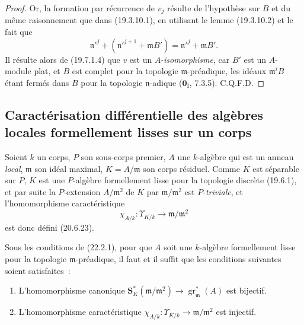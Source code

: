 \begin{proof}

Or, la formation par récurrence de $v_j$ résulte de l'hypothèse sur $B$ et
du même raisonnement que dans (19.3.10.1), en utilisant le lemme
(19.3.10.2) et le fait que
\[
  \mathfrak n'^j+(\mathfrak n'^{j+1}+\mathfrak mB')
  =\mathfrak n'^j+\mathfrak mB'.
\]
Il résulte alors de (19.7.1.4) que $v$ est un $A$-\emph{isomorphisme}, car
$B'$ est un $A$-module plat, et $B$ est complet pour la topologie
$\mathfrak m$-préadique, les idéaux $\mathfrak m^iB$ étant fermés dans $B$
pour la topologie $\mathfrak n$-adique ($\mathbf 0_{\mathrm I}$, 7.3.5).
C.Q.F.D.
\end{proof}

\subsection{Caractérisation différentielle des algèbres locales formellement
lisses sur un corps}
\label{subsection:0.22.2-fr}

\begin{env}[22.2.1]
\label{0.22.2.1-fr}
Soient $k$ un corps, $P$ son sous-corps premier, $A$ une $k$-algèbre qui est
un anneau \emph{local}, $\mathfrak m$ son idéal maximal, $K=A/\mathfrak m$
son corps résiduel. Comme $K$ est séparable sur $P$, $K$ est une
$P$-algèbre formellement lisse pour la topologie discrète (19.6.1), et par
suite la $P$-extension $A/\mathfrak m^2$ de $K$ par
$\mathfrak m/\mathfrak m^2$ est $P$-\emph{triviale}, et l'homomorphisme
caractéristique
\begin{equation}
\tag{22.2.1.1}
\label{0.22.2.1.1-fr}
  \chi_{A/k}:\Upsilon_{K/k}\longrightarrow\mathfrak m/\mathfrak m^2
\end{equation}
est donc défini (20.6.23).
\end{env}

\begin{theorem}[22.2.2]
\label{0.22.2.2-fr}
Sous les conditions de (22.2.1), pour que $A$ soit une $k$-algèbre
formellement lisse pour la topologie $\mathfrak m$-préadique, il faut et il
suffit que les conditions suivantes soient satisfaites~:
\begin{enumerate}
  \item[(i)] L'homomorphisme canonique
  $\mathbf S_K^*(\mathfrak m/\mathfrak m^2)\to
  \operatorname{gr}_{\mathfrak m}^*(A)$ est bijectif.
  \item[(ii)] L'homomorphisme caractéristique
  $\chi_{A/k}:\Upsilon_{K/k}\to\mathfrak m/\mathfrak m^2$ est injectif.
\end{enumerate}
\end{theorem}

